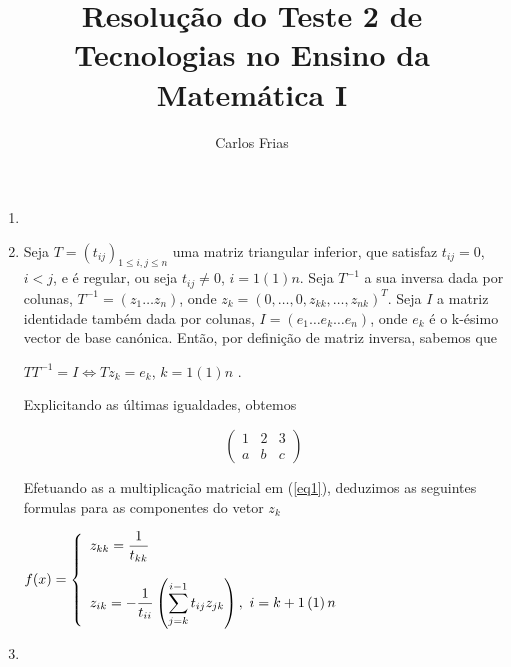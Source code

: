 \documentclass{article}
\title{Resolução do Teste 2 de Tecnologias no Ensino da Matemática I}
\author{Carlos Frias}
\begin{document}
\maketitle

\begin{enumerate}
    \item \hfil
    \item Seja $T=\left(t_{ij}\right)_{1\leq i,j \leq n}$ uma matriz triangular inferior, que satisfaz $t_{ij}=0$, $i<j$, e é regular, ou seja $t_{ij}\neq0$, $i=1\left(1\right)n$. 
    Seja $T^{-1}$ a sua inversa dada por colunas, $T^{-1}=\left(z_1 \ldots z_n\right)$, onde $z_k={\left(0, \ldots, 0, z_{kk}, \ldots, z_{nk}\right)}^T$.
    Seja $I$ a matriz identidade também dada por colunas, $I=\left(e_1 \ldots e_k \ldots e_n\right)$, onde $e_k$ é o k-ésimo vector de base canónica. 
    Então, por definição de matriz inversa, sabemos que

    \begin{center}
        $TT^{-1}=I\Leftrightarrow Tz_k=e_k$, $k=1\left(1\right)n$ .
    \end{center}

    Explicitando as últimas igualdades, obtemos
    
    \begin{equation}
        \begin{pmatrix}
            1 & 2 & 3\\
            a & b & c
        \end{pmatrix}
        \label{eq1}
    \end{equation}

    Efetuando as a multiplicação matricial em (\ref{eq1}), deduzimos as seguintes formulas para as componentes do vetor $z_k$
    
    \begin{center}
        $f(x)=\left\{
            \begin{array}{ll}
                \displaystyle z_{kk}=\frac{1}{t_{kk}}\\
                \displaystyle  \\
                \displaystyle z_{ik}=-\frac{1}{t_{ii}}\left(\sum_{j=k}^{i-1} t_{ij} z_{jk}\right),~i=k+1\left(1\right)n
            \end{array}\right.$
    \end{center}

    \item  \hfil
    

\end{enumerate}
\end{document}
